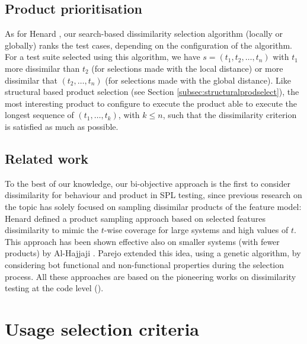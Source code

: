 \subsection{Product prioritisation}

As for Henard \etal \cite{Henard2014a}, our search-based dissimilarity selection algorithm (locally or globally) ranks the test cases, depending on the configuration of the algorithm. For a test suite selected using this algorithm, we have $s = (t_1, t_2, \ldots, t_n )$ with $t_1$ more dissimilar than $t_2$ (for selections made with the local distance) or more dissimilar that $(t_2, \ldots, t_n)$ (for selections made with the global distance). Like structural based product selection (see Section \ref{subsec:structuralprodselect}), the most interesting product to configure to execute the product able to execute the longest sequence of $(t_1, \ldots , t_k)$, with $k \leq n$, such that the dissimilarity criterion is satisfied as much as possible.


\subsection{Related work}

To the best of our knowledge, our bi-objective approach is the first to consider dissimilarity for behaviour and product in SPL testing, since previous research on the topic has solely focused on sampling dissimilar products of the feature model: Henard \etal \cite{Henard2014a} defined a product sampling approach based on selected features dissimilarity to mimic the $t$-wise coverage for large systems and high values of $t$. This approach has been shown effective also on smaller systems (with fewer products) by Al-Hajjaji \etal \cite{Al-Hajjaji2016}. Parejo \etal \cite{Parejo2016} extended this idea, using a genetic algorithm, by considering bot functional and non-functional properties during the selection process. 
All these approaches are based on the pioneering works on dissimilarity testing at the code level (\eg \cite{Mondal2015,Hemmati2010}).


\section{Usage selection criteria}

